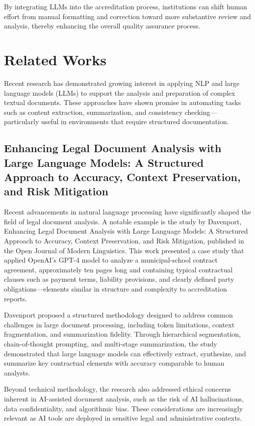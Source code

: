 By integrating LLMs into the accreditation process, institutions can shift human effort from manual formatting and correction toward more substantive review and analysis, thereby enhancing the overall quality assurance process.
\section{Related Works}
Recent research has demonstrated growing interest in applying NLP and large language models (LLMs) to support the analysis and preparation of complex textual documents. These approaches have shown promise in automating tasks such as content extraction, summarization, and consistency checking—particularly useful in environments that require structured documentation.
\subsection{Enhancing Legal Document Analysis with Large Language Models: A Structured Approach to Accuracy, Context Preservation, and Risk Mitigation} 

Recent advancements in natural language processing have significantly shaped the field of legal document analysis. A notable example is the study by Davenport, Enhancing Legal Document Analysis with Large Language Models: A Structured Approach to Accuracy, Context Preservation, and Risk Mitigation\cite{davenport}, published in the Open Journal of Modern Linguistics. This work presented a case study that applied OpenAI’s GPT-4 model to analyze a municipal-school contract agreement, approximately ten pages long and containing typical contractual clauses such as payment terms, liability provisions, and clearly defined party obligations—elements similar in structure and complexity to accreditation reports.

Davenport proposed a structured methodology designed to address common challenges in large document processing, including token limitations, context fragmentation, and summarization fidelity. Through hierarchical segmentation, chain-of-thought prompting, and multi-stage summarization, the study demonstrated that large language models can effectively extract, synthesize, and summarize key contractual elements with accuracy comparable to human analysts.

Beyond technical methodology, the research also addressed ethical concerns inherent in AI-assisted document analysis, such as the risk of AI hallucinations, data confidentiality, and algorithmic bias. These considerations are increasingly relevant as AI tools are deployed in sensitive legal and administrative contexts.

